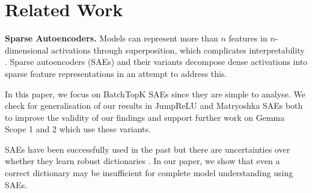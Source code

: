 \section{Related Work}\label{s:related-work}

\textbf{Sparse Autoencoders.} 
Models can represent more than $n$ features in $n$-dimensional activations through superposition, which complicates interpretability \citep{elhage2022toy}.
Sparse autoencoders (SAEs) \citep{bricken2023monosemanticity, huben2024sparse} and their variants \citep{gao2024scaling, bussmann2024batchtopk, rajamanoharan2024jumping, bussmann2025learning, karvonen2025saebench, leask2025inference} decompose dense activations into sparse feature representations in an attempt to address this.

In this paper, we focus on BatchTopK SAEs \citep{bussmann2024batchtopk} since they are simple to analyse. We check for generalisation of our results in JumpReLU \citep{rajamanoharan2024jumping} and Matryoshka \citep{bussmann2024batchtopk} SAEs both to improve the validity of our findings and support further work on Gemma Scope 1 \cite{lieberum2024gemma} and 2 \cite{mcdougall2025gemmascope2} which use these variants.

SAEs have been successfully used in the past \citep{marks2025auditing, movva2025sparse} but there are uncertainties over whether they learn robust dictionaries \citep{chanin2024absorption,leask2025sparse}. In our paper, we show that even a correct dictionary may be insufficient for complete model understanding using SAEs.


